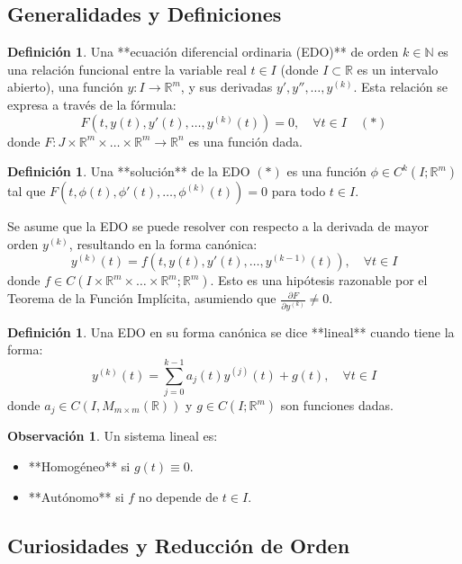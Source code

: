 \documentclass[11pt]{article}
\theoremstyle{definition} %
\newtheorem{definition}[theorem]{Definición}
\newtheorem{remark}[theorem]{Observación}
\begin{document}
\subsection{Generalidades y Definiciones}
\begin{definition}
Una **ecuación diferencial ordinaria (EDO)** de orden $k \in \mathbb{N}$ es una relación funcional entre la variable real $t \in I$ (donde $I \subset \mathbb{R}$ es un intervalo abierto), una función $y: I \rightarrow \mathbb{R}^m$, y sus derivadas $y', y'', \dots, y^{(k)}$. Esta relación se expresa a través de la fórmula:
$$F(t, y(t), y'(t), \dots, y^{(k)}(t)) = 0, \quad \forall t \in I \quad (*)$$
donde $F: J \times \mathbb{R}^m \times \dots \times \mathbb{R}^m \rightarrow \mathbb{R}^n$ es una función dada.
\end{definition}

\begin{definition}
Una **solución** de la EDO $(*)$ es una función $\phi \in C^k(I; \mathbb{R}^m)$ tal que $F(t, \phi(t), \phi'(t), \dots, \phi^{(k)}(t)) = 0$ para todo $t \in I$.
\end{definition}

Se asume que la EDO se puede resolver con respecto a la derivada de mayor orden $y^{(k)}$, resultando en la forma canónica:
$$y^{(k)}(t) = f(t, y(t), y'(t), \dots, y^{(k-1)}(t)), \quad \forall t \in I$$
donde $f \in C(I \times \mathbb{R}^m \times \dots \times \mathbb{R}^m; \mathbb{R}^m)$. Esto es una hipótesis razonable por el Teorema de la Función Implícita, asumiendo que $\frac{\partial F}{\partial y^{(k)}} \ne 0$.

\begin{definition}
Una EDO en su forma canónica se dice **lineal** cuando tiene la forma:
$$y^{(k)}(t) = \sum_{j=0}^{k-1} a_j(t) y^{(j)}(t) + g(t), \quad \forall t \in I$$
donde $a_j \in C(I, M_{m \times m}(\mathbb{R}))$ y $g \in C(I; \mathbb{R}^m)$ son funciones dadas.
\end{definition}

\begin{remark}
Un sistema lineal es:
\begin{itemize}
    \item **Homogéneo** si $g(t) \equiv 0$.
    \item **Autónomo** si $f$ no depende de $t \in I$.
\end{itemize}
\end{remark}

\subsection{Curiosidades y Reducción de Orden}
\label{sec:curiosidades}
\end{document}

